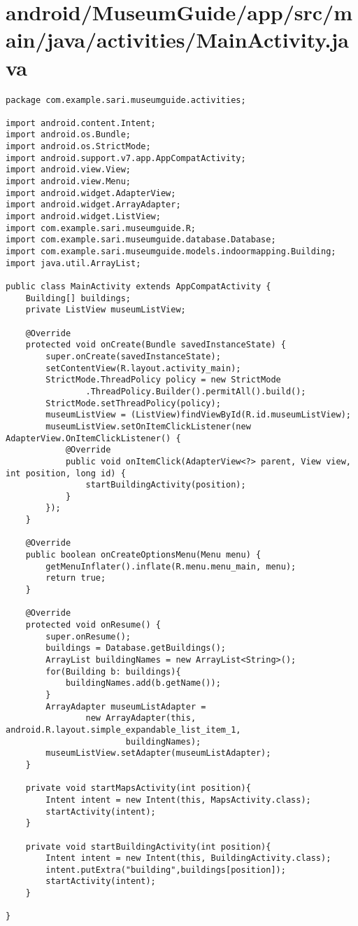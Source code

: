 \section{android/MuseumGuide/app/src/main/java/activities/MainActivity.java}
\begin{lstlisting}package com.example.sari.museumguide.activities;

import android.content.Intent;
import android.os.Bundle;
import android.os.StrictMode;
import android.support.v7.app.AppCompatActivity;
import android.view.View;
import android.view.Menu;
import android.widget.AdapterView;
import android.widget.ArrayAdapter;
import android.widget.ListView;
import com.example.sari.museumguide.R;
import com.example.sari.museumguide.database.Database;
import com.example.sari.museumguide.models.indoormapping.Building;
import java.util.ArrayList;

public class MainActivity extends AppCompatActivity {
    Building[] buildings;
    private ListView museumListView;

    @Override
    protected void onCreate(Bundle savedInstanceState) {
        super.onCreate(savedInstanceState);
        setContentView(R.layout.activity_main);
        StrictMode.ThreadPolicy policy = new StrictMode
                .ThreadPolicy.Builder().permitAll().build();
        StrictMode.setThreadPolicy(policy);
        museumListView = (ListView)findViewById(R.id.museumListView);
        museumListView.setOnItemClickListener(new AdapterView.OnItemClickListener() {
            @Override
            public void onItemClick(AdapterView<?> parent, View view, int position, long id) {
                startBuildingActivity(position);
            }
        });
    }

    @Override
    public boolean onCreateOptionsMenu(Menu menu) {
        getMenuInflater().inflate(R.menu.menu_main, menu);
        return true;
    }

    @Override
    protected void onResume() {
        super.onResume();
        buildings = Database.getBuildings();
        ArrayList buildingNames = new ArrayList<String>();
        for(Building b: buildings){
            buildingNames.add(b.getName());
        }
        ArrayAdapter museumListAdapter =
                new ArrayAdapter(this, android.R.layout.simple_expandable_list_item_1,
                        buildingNames);
        museumListView.setAdapter(museumListAdapter);
    }

    private void startMapsActivity(int position){
        Intent intent = new Intent(this, MapsActivity.class);
        startActivity(intent);
    }

    private void startBuildingActivity(int position){
        Intent intent = new Intent(this, BuildingActivity.class);
        intent.putExtra("building",buildings[position]);
        startActivity(intent);
    }

}
\end{lstlisting}
\newpage

